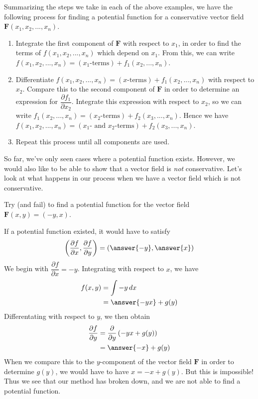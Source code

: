 \documentclass{ximera}
\begin{document}
Summarizing the steps we take in each of the above examples, we have the following process for finding a potential function for a conservative vector field $\mathbf{F}(x_1,x_2,...,x_n)$.
\begin{enumerate}
\item Integrate the first component of $\mathbf{F}$ with respect to $x_1$, in order to find the terms of $f(x_1,x_2,...,x_n)$ which depend on $x_1$. From this, we can write $f(x_1,x_2,...,x_n)=(x_1\textrm{-terms})+f_1(x_2,...,x_n)$.
\item Differentiate $f(x_1,x_2,...,x_n)=(x\textrm{-terms})+f_1(x_2,...,x_n)$ with respect to $x_2$. Compare this to the second component of $\mathbf{F}$ in order to determine an expression for $\dfrac{\partial f_1}{\partial x_2}$. Integrate this expression with respect to $x_2$, so we can write $f_1(x_2,...,x_n)=(x_2\textrm{-terms})+f_2(x_3,...,x_n)$. Hence we have $f(x_1,x_2,...,x_n)=(x_1\textrm{- and }x_2\textrm{-terms})+f_2(x_3,...,x_n)$.
\item Repeat this process until all components are used.
\end{enumerate}

So far, we've only seen cases where a potential function exists. However, we would also like to be able to show that a vector field is \emph{not} conservative. Let's look at what happens in our process when we have a vector field which is not conservative.

\begin{example}
Try (and fail) to find a potential function for the vector field $\mathbf{F}(x,y) = (-y,x)$.
\begin{explanation}
If a potential function existed, it would have to satisfy
\[
\left(\dfrac{\partial f}{\partial x},\dfrac{\partial f}{\partial y}\right) = (\answer{-y},\answer{x})
\]
We begin with $\dfrac{\partial f}{\partial x} = -y$. Integrating with respect to $x$, we have
\begin{align*}
f(x,y) &= \int -y\,dx\\
&=\answer{-yx}+g(y)
\end{align*}
Differentating with respect to $y$, we then obtain
\begin{align*}
\dfrac{\partial f}{\partial y} &= \dfrac{\partial}{\partial y}\left(-yx+g(y)\right)\\
&= \answer{-x}+g(y)
\end{align*}
When we compare this to the $y$-component of the vector field $\mathbf{F}$ in order to determine $g(y)$, we would have to have $x=-x+g(y)$. But this is impossible! Thus we see that our method has broken down, and we are not able to find a potential function.
\end{explanation}
\end{example}
\end{document}
